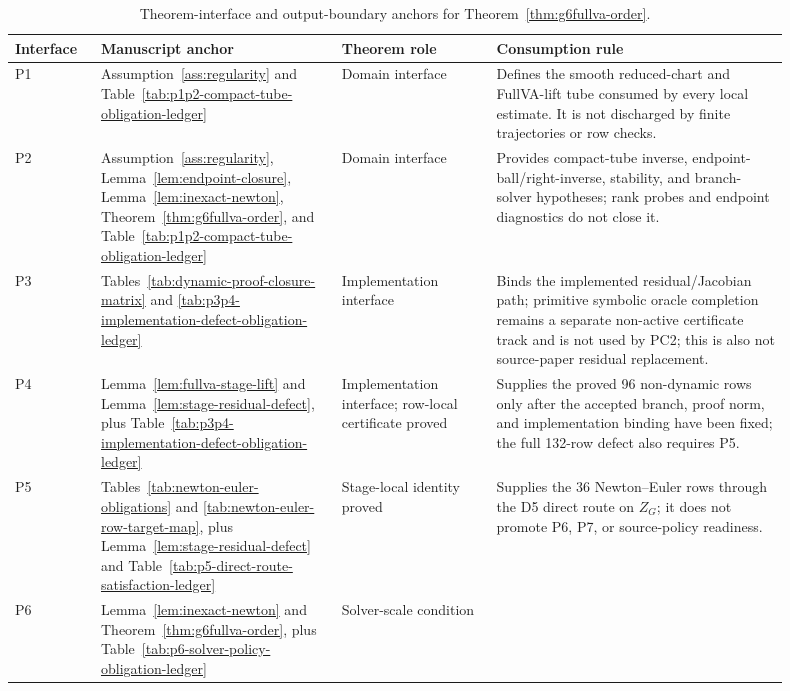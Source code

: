 \documentclass[preprint,12pt]{elsarticle}
\begin{document}
\begin{table}[htbp]
\centering
\caption{Theorem-interface and output-boundary anchors for
Theorem~\ref{thm:g6fullva-order}.}
\label{tab:theorem-assumption-anchor-ledger}
\scriptsize
\setlength{\tabcolsep}{2pt}
\renewcommand{\arraystretch}{0.9}
\begin{tabular}{P{0.10\linewidth}P{0.28\linewidth}P{0.18\linewidth}P{0.34\linewidth}}
\toprule
Interface & Manuscript anchor & Theorem role & Consumption rule \\
\midrule
P1 & Assumption~\ref{ass:regularity} and
Table~\ref{tab:p1p2-compact-tube-obligation-ledger} &
Domain interface &
Defines the smooth reduced-chart and FullVA-lift tube consumed by every local
estimate. It is not discharged by finite trajectories or row checks. \\
P2 & Assumption~\ref{ass:regularity}, Lemma~\ref{lem:endpoint-closure},
Lemma~\ref{lem:inexact-newton}, Theorem~\ref{thm:g6fullva-order}, and
Table~\ref{tab:p1p2-compact-tube-obligation-ledger} &
Domain interface &
Provides compact-tube inverse, endpoint-ball/right-inverse, stability, and
branch-solver hypotheses; rank probes and endpoint diagnostics do not close it. \\
P3 & Tables~\ref{tab:dynamic-proof-closure-matrix} and
\ref{tab:p3p4-implementation-defect-obligation-ledger} &
Implementation interface &
Binds the implemented residual/Jacobian path; primitive symbolic
oracle completion remains a separate non-active certificate track and is not
used by PC2; this is also not source-paper residual replacement. \\
P4 & Lemma~\ref{lem:fullva-stage-lift} and
Lemma~\ref{lem:stage-residual-defect}, plus
Table~\ref{tab:p3p4-implementation-defect-obligation-ledger} &
Implementation interface; row-local certificate proved &
Supplies the proved 96 non-dynamic rows only after the accepted branch,
proof norm, and implementation binding have been fixed; the full 132-row
defect also requires P5. \\
P5 & Tables~\ref{tab:newton-euler-obligations} and
\ref{tab:newton-euler-row-target-map}, plus
Lemma~\ref{lem:stage-residual-defect} and
Table~\ref{tab:p5-direct-route-satisfaction-ledger} &
Stage-local identity proved &
Supplies the 36 Newton--Euler rows through the D5 direct route on \(Z_G\);
it does not promote P6, P7, or source-policy readiness. \\
P6 & Lemma~\ref{lem:inexact-newton} and
Theorem~\ref{thm:g6fullva-order}, plus
Table~\ref{tab:p6-solver-policy-obligation-ledger} &
Solver-scale condition &

\end{tabular}
\end{table}
\end{document}
